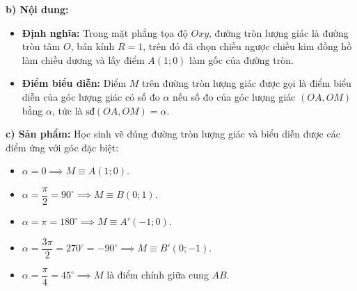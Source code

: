 \documentclass[12pt, a4paper]{article}
\begin{document}
\textbf{b) Nội dung:}
\begin{itemize}[leftmargin=0.6cm]
    \item \textbf{Định nghĩa:} Trong mặt phẳng tọa độ $Oxy$, đường tròn lượng giác là đường tròn tâm $O$, bán kính $R = 1$, trên đó đã chọn chiều ngược chiều kim đồng hồ làm chiều dương và lấy điểm $A(1; 0)$ làm gốc của đường tròn.
    \item \textbf{Điểm biểu diễn:} Điểm $M$ trên đường tròn lượng giác được gọi là điểm biểu diễn của góc lượng giác có số đo $\alpha$ nếu số đo của góc lượng giác $(OA, OM)$ bằng $\alpha$, tức là $\text{sđ}(OA, OM) = \alpha$.
\end{itemize}

\textbf{c) Sản phẩm:} Học sinh vẽ đúng đường tròn lượng giác và biểu diễn được các điểm ứng với góc đặc biệt:
\begin{itemize}[leftmargin=0.6cm]
    \item $\alpha = 0 \implies M \equiv A(1; 0)$.
    \item $\alpha = \dfrac{\pi}{2} = 90^\circ \implies M \equiv B(0; 1)$.
    \item $\alpha = \pi = 180^\circ \implies M \equiv A'(-1; 0)$.
    \item $\alpha = \dfrac{3\pi}{2} = 270^\circ = -90^\circ \implies M \equiv B'(0; -1)$.
    \item $\alpha = \dfrac{\pi}{4} = 45^\circ \implies M$ là điểm chính giữa cung $AB$.
\end{itemize}
\end{document}
